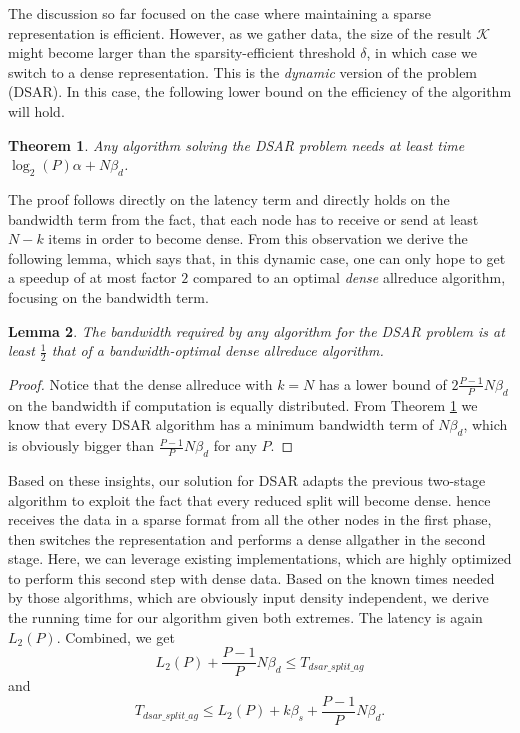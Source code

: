 \documentclass[11pt]{article}
\newtheorem{theorem}{Theorem}[section]
\newtheorem{lemma}[theorem]{Lemma}
\begin{document}
The discussion so far focused on the case where maintaining a sparse representation is efficient. 
However, as we gather data, the size of the result $\mathcal{K}$ might become larger than the sparsity-efficient threshold $\delta$, in which case we switch to a dense representation. 
This is the \emph{dynamic} version of the problem (DSAR).
In this case, the following lower bound on the efficiency of the algorithm will hold.

\begin{theorem}
	Any algorithm solving the DSAR problem needs at least time $\log_2(P)\alpha + N\beta_d$.
	\label{lem:dsar_min_dur}
\end{theorem}

The proof follows directly on the latency term and directly holds on the bandwidth term from the fact, that each node has to receive or send at least $N-k$ items in order to become dense. From this observation we derive the following lemma, which says that, in this dynamic case, one can only hope to get a speedup of at most factor $2$ compared to an optimal \emph{dense} allreduce algorithm,  focusing on the bandwidth term.

\begin{lemma}
	The bandwidth required by any algorithm for the DSAR problem is at least $\frac{1}{2}$ that of a bandwidth-optimal dense allreduce algorithm.
\end{lemma}
\begin{proof}
	Notice that the dense allreduce with $k=N$ has a lower bound of $2\frac{P-1}{P}N\beta_d$ on the bandwidth if computation is equally distributed. From Theorem \ref{lem:dsar_min_dur} we know that every DSAR algorithm has a minimum bandwidth term of $N\beta_d$, which is obviously bigger than $\frac{P-1}{P}N\beta_d$ for any $P$.
\end{proof}

Based on these insights, our solution for DSAR adapts the previous two-stage algorithm to exploit the fact that every reduced split will become dense. \dsar{} hence receives the data in a sparse format from all the other nodes in the first phase, then switches the representation and performs a dense allgather in the second stage. Here, we can leverage existing implementations, which are highly optimized to perform this second step with dense data. Based on the known times needed by those algorithms, which are obviously input density independent, we derive the running time for our algorithm given both extremes. The latency is again $L_2(P)$. Combined, we get $$L_2(P) + \frac{P-1}{P}N\beta_d \leq T_{dsar\_split\_ag}$$and $$T_{dsar\_split\_ag} \leq L_2(P) + k\beta_s + \frac{P-1}{P}N\beta_d.$$
\end{document}
